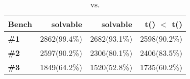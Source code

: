 {
	\begin{table}\small
		\setlength{\tabcolsep}{1pt}
		\begin{center}
			\begin{tabular}{| l | r | r | r |}
				
				\hline
				\textbf{Bench} & \sctl{} solvable & \sctlprovr{} solvable & t(\sctlprov) $<$ t(\sctlprovr{})  \\
				\hline
				\textbf{\#1} & 2862(99.4\%) & 2682(93.1\%) & 2598(90.2\%)\\
				\hline
				\textbf{\#2} & 2597(90.2\%) & 2306(80.1\%) & 2406(83.5\%)\\
				\hline
				\textbf{\#3} & 1849(64.2\%) & 1520(52.8\%) & 1735(60.2\%)\\
				\hline
			\end{tabular}
		\end{center}
		\caption{\sctl{} vs. \sctlprovr{}}
		\label{tabl:cont_vs_rec}
	\end{table}
}

